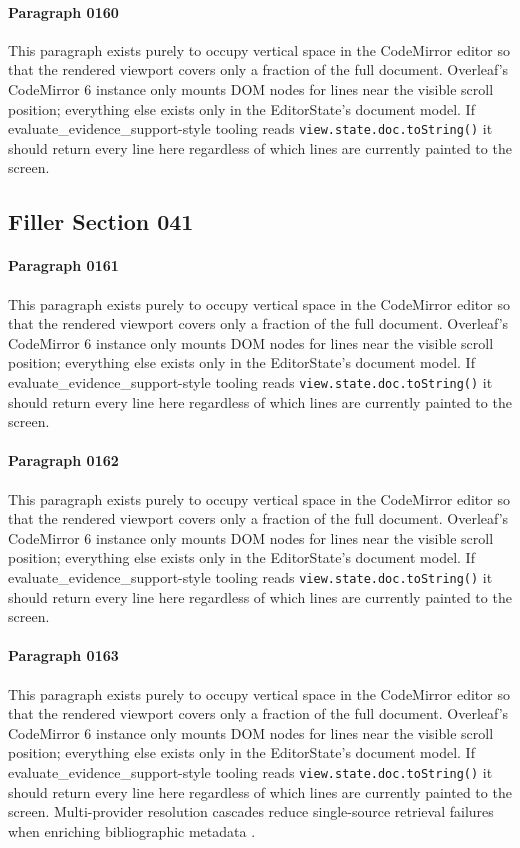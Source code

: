 \documentclass{article}
\begin{document}
\paragraph{Paragraph 0160}
This paragraph exists purely to occupy vertical space in the CodeMirror editor so that the rendered viewport covers only a fraction of the full document. Overleaf's CodeMirror 6 instance only mounts DOM nodes for lines near the visible scroll position; everything else exists only in the EditorState's document model. If evaluate\_evidence\_support-style tooling reads \texttt{view.state.doc.toString()} it should return every line here regardless of which lines are currently painted to the screen.

\subsection{Filler Section 041}
\paragraph{Paragraph 0161}
This paragraph exists purely to occupy vertical space in the CodeMirror editor so that the rendered viewport covers only a fraction of the full document. Overleaf's CodeMirror 6 instance only mounts DOM nodes for lines near the visible scroll position; everything else exists only in the EditorState's document model. If evaluate\_evidence\_support-style tooling reads \texttt{view.state.doc.toString()} it should return every line here regardless of which lines are currently painted to the screen.

\paragraph{Paragraph 0162}
This paragraph exists purely to occupy vertical space in the CodeMirror editor so that the rendered viewport covers only a fraction of the full document. Overleaf's CodeMirror 6 instance only mounts DOM nodes for lines near the visible scroll position; everything else exists only in the EditorState's document model. If evaluate\_evidence\_support-style tooling reads \texttt{view.state.doc.toString()} it should return every line here regardless of which lines are currently painted to the screen.

\paragraph{Paragraph 0163}
This paragraph exists purely to occupy vertical space in the CodeMirror editor so that the rendered viewport covers only a fraction of the full document. Overleaf's CodeMirror 6 instance only mounts DOM nodes for lines near the visible scroll position; everything else exists only in the EditorState's document model. If evaluate\_evidence\_support-style tooling reads \texttt{view.state.doc.toString()} it should return every line here regardless of which lines are currently painted to the screen. Multi-provider resolution cascades reduce single-source retrieval failures when enriching bibliographic metadata \citep{mensah2023resolver}.
\end{document}

